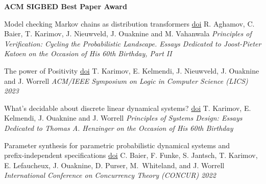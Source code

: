 \documentclass{article}
\begin{document}
\begin{etaremune}
		\textbf{ACM SIGBED Best Paper Award}
		\vspace*{0.2cm}
		
		\newpage
		\item 
		{\large Model checking Markov chains as distribution transformers}
		\quad
		\href{https://doi.org/10.1007/978-3-031-75775-4_13}{doi}
		\vspace{0.2cm}\newline
		R. Aghamov, C. Baier, T. Karimov, J. Nieuwveld, J. Ouaknine and M. Vahanwala
		\vspace*{0.25cm}\newline
		\emph{Principles of Verification: Cycling the Probabilistic Landscape. Essays Dedicated to Joost-Pieter Katoen on the Occasion of His 60th Birthday, Part II}
		\vspace*{0.2cm}
		
		\item 
		{\large *The power of Positivity}
		\quad
		\href{https://doi.org/10.1109/LICS56636.2023.10175758}{doi}
		\vspace{0.2cm}\newline
		T. Karimov, E. Kelmendi, J. Nieuwveld, J. Ouaknine and J. Worrell
		\vspace*{0.25cm}\newline
		\emph{ACM/IEEE Symposium on Logic in Computer Science (LICS) 2023} 
		\vspace*{0.2cm}
		
		\item 
		{\large *What's decidable about discrete linear dynamical systems?}
		\quad
		\href{https://doi.org/10.1007/978-3-031-22337-2_2}{doi}
		\vspace{0.2cm}\newline
		T. Karimov, E. Kelmendi, J. Ouaknine and J. Worrell
		\vspace*{0.25cm}\newline
		\emph{Principles of Systems Design: Essays Dedicated to Thomas A. Henzinger on the Occasion of His 60th Birthday}
		\vspace*{0.2cm}
		
		\item 
		{\large Parameter synthesis for parametric probabilistic dynamical systems and \\[0.2cm] prefix-independent specifications}
		\quad
		\href{https://doi.org/10.4230/LIPIcs.CONCUR.2022.10}{doi}
		\vspace{0.2cm}\newline
		C. Baier, F. Funke, S. Jantsch, T. Karimov, E. Lefaucheux, J. Ouaknine, D. Purser, M.~Whiteland, and J. Worrell
		\vspace*{0.25cm}\newline\emph{International Conference on Concurrency Theory (CONCUR) 2022}
		\vspace*{0.2cm}
		

\end{etaremune}
\end{document}
